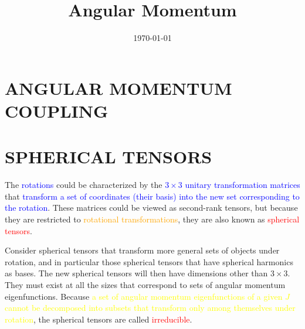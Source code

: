 \documentclass[12pt,a4paper]{article}
\title{Angular Momentum}
\author{}
\date{\today}
\begin{document}
\maketitle























\section{ANGULAR MOMENTUM COUPLING}
\cite{arfken} 







































\section{SPHERICAL TENSORS}
\cite{arfken} The \textcolor{blue}{rotations} could be characterized by the \textcolor{blue}{$3 \times 3$ unitary transformation matrices} that \textcolor{blue}{transform a set of coordinates (their basis) into the new set corresponding to the rotation}. These matrices could be viewed as second-rank tensors, but because they are restricted to \textcolor{orange}{rotational transformations}, they are also known as \textcolor{red}{spherical tensors}.

Consider spherical tensors that transform more general sets of objects under rotation, and in particular those spherical tensors that have spherical harmonics as bases. The new spherical tensors will then have dimensions other than $3 \times 3$. They must exist at all the sizes that correspond to sets of angular momentum eigenfunctions. Because \textcolor{yellow}{a set of angular momentum eigenfunctions of a given $J$ cannot be decomposed into subsets that transform only among themselves under rotation}, the spherical tensors are called \textcolor{red}{irreducible}. 
\end{document}
